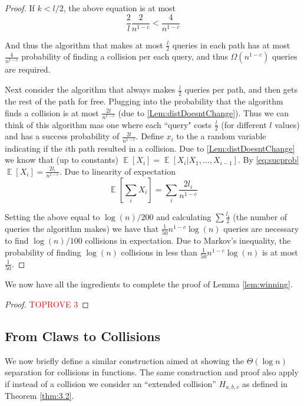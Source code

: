 \documentclass[11pt]{article}
\numberwithin{equation}{section}
\newcommand\E{\mathop{\mathbb E}}
\newcommand{\1}{\mathbf{1}}
\newcommand{\beq}{\begin{equation}}
\newcommand{\eeq}{\end{equation}}
\begin{document}
\begin{proof}
If $k < l/2$, the above equation is at most  
\beq \frac{2}{l} \frac{2}{n^{1-c}} < \frac{4}{n^{1-c}} \eeq 

And thus the algorithm that makes at most $\frac{l}{2}$ queries in each path has at most $\frac{4}{n^{1-c}}$ probability of finding a collision per each query, and thus $\Omega(n^{1-c})$ queries are required.



Next consider the algorithm that always makes $\frac{l}{2}$ queries per path, and then gets the rest of the path for free. Plugging into  the probability that the algorithm finds a collision is at most $\frac{2l}{n^{1-c}}$ (due to \ref{Lem:distDoesntChange}). Thus we can think of this algorithm mas one where each ``query" costs $\frac{l}{2}$ (for different $l$ values) and has a success probability of $\frac{2l}{n^{1-c}}$. Define $x_i$ to the a random variable indicating if the $i$th path resulted in a collision. Due to \ref{Lem:distDoesntChange} we know that (up to constants) $\E[X_i] = \E[X_i | X_1,...,X_{i-1}]$. By \ref{eq:sucprob} $\E[X_i] = \frac{2l_i}{n^{1-c}}$. Due to linearity of expectation \beq \E[\sum_i X_i] = \sum_i \frac{2l_i}{n^{1-c}} \eeq

Setting the above equal to $\log(n)/200$ and calculating $\sum \frac{l_i}{2}$ (the number of queries the algorithm makes) we have that $\frac{1}{50}n^{1-c} \log(n)$ queries are necessary to find $\log(n)/100$ collisions in expectation. Due to Markov's inequality, the probability of finding $\log(n)$ collisions in less than $\frac{1}{50}n^{1-c} \log(n)$ is at most $\frac{1}{50}$.
















\end{proof}
\fi
We now have all the ingredients to complete the proof of Lemma \ref{lem:winning}.

\begin{proof}\textcolor{red}{TOPROVE 3}\end{proof}


\subsection{From Claws to Collisions \label{sec:clawstocollision}}
We now briefly define a similar construction aimed at showing the $\Theta(\log n)$ separation for collisions in functions. The same construction and proof also apply if instead of a collision we consider  an ``extended collision'' $H_{a,b,c}$ as defined in Theorem \ref{thm:3.2}.
\end{document}
